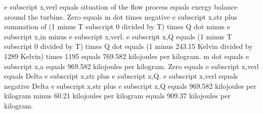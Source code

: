 e subscript x,verl equals situation of the flow process equals exergy balance around the turbine.  
Zero equals m dot times negative e subscript x,str plus summation of (1 minus T subscript 0 divided by T) times Q dot minus e subscript x,in minus e subscript x,verl.  
e subscript x,Q equals (1 minus T subscript 0 divided by T) times Q dot equals (1 minus 243.15 Kelvin divided by 1289 Kelvin) times 1195 equals 769.582 kilojoules per kilogram.  
m dot equals e subscript x,a equals 969.582 kilojoules per kilogram.  
Zero equals e subscript x,verl equals Delta e subscript x,str plus e subscript x,Q.  
e subscript x,verl equals negative Delta e subscript x,str plus e subscript x,Q equals 969.582 kilojoules per kilogram minus 60.21 kilojoules per kilogram equals 909.37 kilojoules per kilogram.